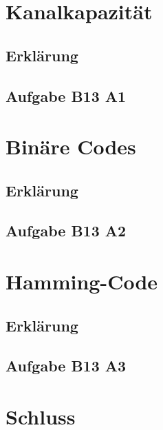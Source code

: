 




\section{Kanalkapazität}
\subsection{Erklärung}
\subsection{Aufgabe B13 A1}


\section{Binäre Codes}
\subsection{Erklärung}
\subsection{Aufgabe B13 A2}


\section{Hamming-Code}
\subsection{Erklärung}
\subsection{Aufgabe B13 A3}


\section{Schluss}
